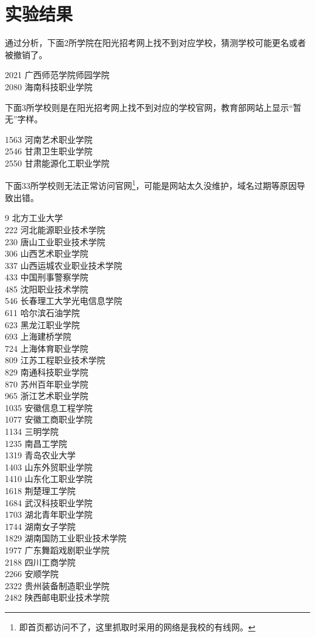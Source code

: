\documentclass[logo,reportComp]{thesis}
\begin{document}
\section{实验结果}
通过分析，下面2所学院在阳光招考网上找不到对应学校，猜测学校可能更名或者被撤销了。
\begin{flushleft}
2021 广西师范学院师园学院\\
2080 海南科技职业学院
\end{flushleft}

下面3所学校则是在阳光招考网上找不到对应的学校官网，教育部网站上显示“暂无”字样。
\begin{flushleft}
1563 河南艺术职业学院\\
2546 甘肃卫生职业学院\\
2550 甘肃能源化工职业学院
\end{flushleft}

下面33所学校则无法正常访问官网\footnote{即首页都访问不了，这里抓取时采用的网络是我校的有线网。}，可能是网站太久没维护，域名过期等原因导致出错。
\begin{flushleft}
9 北方工业大学\\
222 河北能源职业技术学院\\
230 唐山工业职业技术学院\\
306 山西艺术职业学院\\
337 山西运城农业职业技术学院\\
433 中国刑事警察学院\\
485 沈阳职业技术学院\\
546 长春理工大学光电信息学院\\
611 哈尔滨石油学院\\
623 黑龙江职业学院\\
693 上海建桥学院\\
724 上海体育职业学院\\
809 江苏工程职业技术学院\\
829 南通科技职业学院\\
870 苏州百年职业学院\\
965 浙江艺术职业学院\\
1035  安徽信息工程学院\\
1077  安徽工商职业学院\\
1134  三明学院\\
1235  南昌工学院\\
1319  青岛农业大学\\
1403  山东外贸职业学院\\
1410  山东化工职业学院\\
1618  荆楚理工学院\\
1684  武汉科技职业学院\\
1703  湖北青年职业学院\\
1744  湖南女子学院\\
1829  湖南国防工业职业技术学院\\
1977  广东舞蹈戏剧职业学院\\
2188  四川工商学院\\
2266  安顺学院\\
2322  贵州装备制造职业学院\\
2482  陕西邮电职业技术学院
\end{flushleft}
\end{document}
